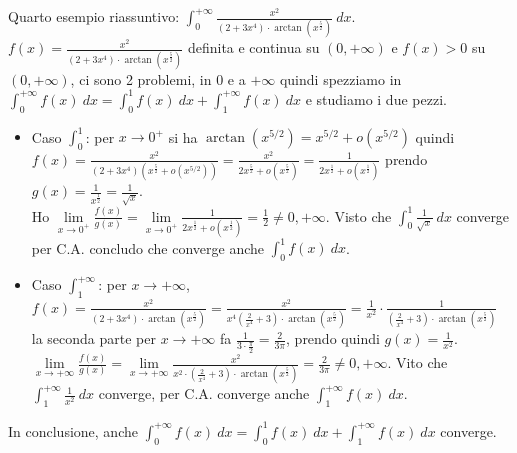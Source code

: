 \begin{example}
Quarto esempio riassuntivo: $\int_0^{+\infty}\frac{x^2}{(2+3x^4)\cdot\arctan(x^{\frac{5}{2}})}\:dx$. $f(x) = \frac{x^2}{(2+3x^4)\cdot\arctan(x^{\frac{5}{2}})}$ definita e continua su $(0,+\infty)$ e $f(x) > 0$ su $(0,+\infty)$, ci sono 2 problemi, in 0 e a $+\infty$ quindi spezziamo in $\int_0^{+\infty}f(x)\:dx = \int_0^1 f(x)\:dx + \int_1^{+\infty}f(x)\:dx$ e studiamo i due pezzi.
\begin{itemize}
    \item Caso $\int_0^1$: per $x\to 0^+$ si ha $\arctan(x^{5/2}) = x^{5/2} + o(x^{5/2})$ quindi $f(x) = \frac{x^2}{(2+3x^4)(x^{\frac{5}{2}} + o(x^{5/2}))} = \frac{x^2}{2x^{\frac{5}{2}} + o(x^{\frac{5}{2}})} = \frac{1}{2x^{\frac{1}{2}} + o(x^{\frac{1}{2}})}$ prendo $g(x) = \frac{1}{x^{\frac{1}{2}}} = \frac{1}{\sqrt{x}}$.\\
    Ho $\lim\limits_{x\to 0^+}\frac{f(x)}{g(x)} = \lim\limits_{x\to 0^+}\frac{1}{2x^{\frac{1}{2}} + o(x^{\frac{1}{2}})} = \frac{1}{2} \neq 0, +\infty$. Visto che $\int_0^1 \frac{1}{\sqrt{x}}\:dx$ converge per C.A. concludo che converge anche $\int_0^1 f(x)\:dx$.
    \item Caso $\int_1^{+\infty}$: per $x\to +\infty$, $f(x) = \frac{x^2}{(2+3x^4)\cdot\arctan(x^{\frac{5}{2}})} = \frac{x^2}{x^4(\frac{2}{x^4}+3)\cdot\arctan(x^{\frac{5}{2}})} = \frac{1}{x^2} \cdot \frac{1}{(\frac{2}{x^4} + 3)\cdot \arctan(x^{\frac{5}{2}})}$ la seconda parte per $x\to +\infty$ fa $\frac{1}{3\cdot \frac{\pi}{2}} = \frac{2}{3\pi}$, prendo quindi $g(x) = \frac{1}{x^2}$.\\
    $\lim\limits_{x\to +\infty}\frac{f(x)}{g(x)} = \lim\limits_{x\to +\infty}\frac{x^2}{x^2\cdot(\frac{2}{x^4} + 3)\cdot \arctan(x^{\frac{5}{2}})} = \frac{2}{3\pi} \neq 0, +\infty$. Vito che $\int_1^{+\infty}\frac{1}{x^2}\:dx$ converge, per C.A. converge anche $\int_1^{+\infty}f(x)\:dx$.
\end{itemize}
In conclusione, anche $\int_0^{+\infty}f(x)\:dx = \int_0^1 f(x)\:dx + \int_1^{+\infty}f(x)\:dx$ converge.
\end{example}

